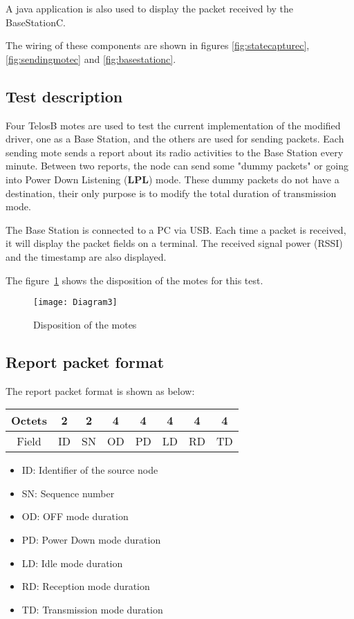 \documentclass[a4paper,11pt]{article}
\begin{document}
A java application is also used to display the packet received by the BaseStationC.

The wiring of these components are shown in figures \ref{fig:statecapturec}, \ref{fig:sendingmotec} and \ref{fig:basestationc}.


  \subsection{Test description}

Four TelosB motes are used to test the current implementation of the modified driver, one as a Base Station, and the others are used for sending packets. Each sending mote sends a report about its radio activities to the Base Station every minute. Between two reports, the node can send some "dummy packets" or going into Power Down Listening (\textbf{LPL}) mode.
These dummy packets do not have a destination, their only purpose is to modify the total duration of transmission mode.

The Base Station is connected to a PC via USB. Each time a packet is received, it will display the packet fields on a terminal. The received signal power (RSSI) and the timestamp are also displayed.

The figure~\ref{fig:testbench} shows the disposition of the motes for this test.

  \begin{figure}[here]
    \centering
    \texttt{[image: Diagram3]}
    \caption{Disposition of the motes}
    \label{fig:testbench}
  \end{figure}

  \subsection{Report packet format}

The report packet format is shown as below:

  \begin{tabular}{|c|c|c|c|c|c|c|c|}
    \hline
    Octets & 2 & 2 & 4 & 4 & 4 & 4 & 4 \\
    \hline
    Field & ID & SN & OD & PD & LD & RD & TD \\
    \hline
  \end{tabular}

  \begin{itemize}
    \item ID: Identifier of the source node
    \item SN: Sequence number
    \item OD: OFF mode duration
    \item PD: Power Down mode duration
    \item LD: Idle mode duration
    \item RD: Reception mode duration
    \item TD: Transmission mode duration
  \end{itemize}
\end{document}
